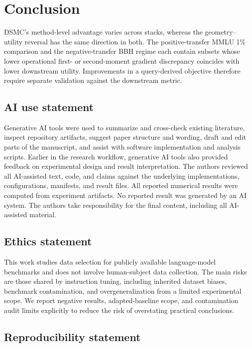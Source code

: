 \documentclass{article}
\begin{document}
\section{Conclusion}

DSMC's method-level advantage varies across stacks, whereas the
geometry--utility reversal has the same direction in both. The positive-transfer
MMLU 1\% comparison and the negative-transfer BBH regime each contain subsets
whose lower operational first- or second-moment gradient discrepancy coincides
with lower downstream utility. Improvements in a query-derived objective
therefore require separate validation against the downstream metric.

\subsection*{AI use statement}

Generative AI tools were used to summarize and cross-check existing literature,
inspect repository artifacts, suggest paper structure and wording, draft and
edit parts of the manuscript, and assist with software implementation and
analysis scripts. Earlier in the research workflow, generative AI tools also
provided feedback on experimental design and result interpretation. The
authors reviewed all AI-assisted text, code, and claims against the underlying
implementations, configurations, manifests, and result files. All reported
numerical results were computed from experiment artifacts. No reported result
was generated by an AI system. The authors take responsibility for the final
content, including all AI-assisted material.

\subsection*{Ethics statement}

This work studies data selection for publicly available language-model
benchmarks and does not involve human-subject data collection. The main risks
are those shared by instruction tuning, including inherited dataset biases,
benchmark contamination, and overgeneralization from a limited experimental
scope. We report negative results, adapted-baseline scope, and contamination
audit limits explicitly to reduce the risk of overstating practical
conclusions.

\subsection*{Reproducibility statement}
\end{document}
